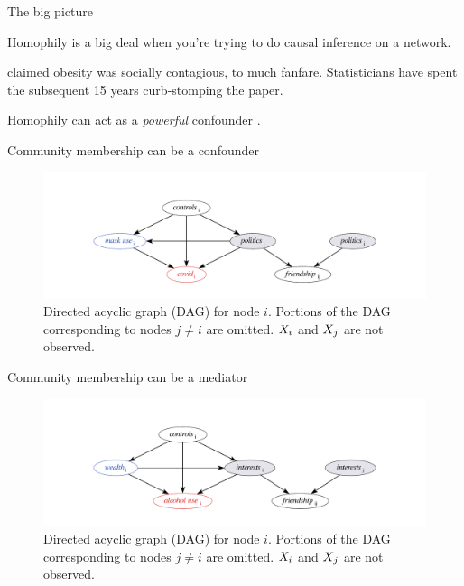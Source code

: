 \documentclass{beamer}
\theoremstyle{remark}
\begin{document}
\begin{frame}{The big picture}

    Homophily is a big deal when you're trying to do causal inference on a network.

    \cite{christakis_spread_2007} claimed obesity was socially contagious, to much fanfare. Statisticians have spent the subsequent 15 years curb-stomping the paper.

    Homophily can act as a \emph{powerful} confounder \citep{shalizi_homophily_2011}.

\end{frame}


\begin{frame}{Community membership can be a confounder}

    \begin{figure}
        \centering
        \includegraphics[width=1.1\textwidth]{figures/concrete-confounding-homophily.pdf}
        \caption{Directed acyclic graph (DAG) for node $i$. Portions of the DAG corresponding to nodes $j \neq i$ are omitted. $X_i$ and $X_j$ are not observed.}
        \label{fig:concrete-confounding}
    \end{figure}

\end{frame}

\begin{frame}{Community membership can be a mediator}

    \begin{figure}
        \centering
        \includegraphics[width=1.1\textwidth]{figures/concrete-mediating-homophily.pdf}
        \caption{Directed acyclic graph (DAG) for node $i$. Portions of the DAG corresponding to nodes $j \neq i$ are omitted. $X_i$ and $X_j$ are not observed.}
        \label{fig:concrete-mediating}
    \end{figure}

\end{frame}
\end{document}

